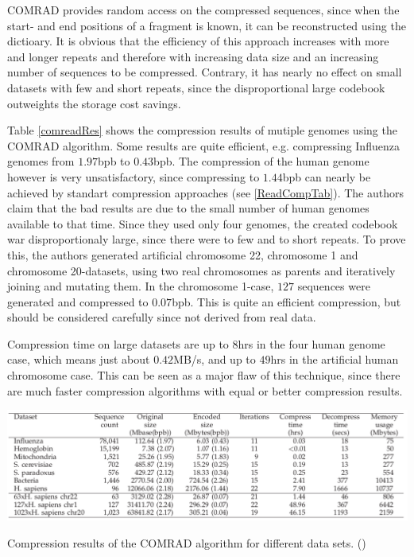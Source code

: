 \documentclass[acmtocl,acmnow]{article}
\begin{document}
COMRAD provides random access on the compressed sequences, since when the start- and end positions of a fragment is 
known, it can be reconstructed using the dictioary. It is obvious that the efficiency of this approach increases with more
and longer repeats and therefore with increasing data size and an increasing number of sequences to be compressed.
Contrary, it has nearly no effect on small datasets with few and short repeats, since the disproportional large codebook
outweights the storage cost savings.

Table \ref{comreadRes} shows the compression results of mutiple genomes using the COMRAD algorithm. Some results are quite
efficient, e.g. compressing Influenza genomes from $1.97$bpb to $0.43$bpb. The compression of the human genome however is
very unsatisfactory, since compressing to $1.44$bpb can nearly be achieved by standart compression approaches (see 
\ref{ReadCompTab}).
The authors claim that the bad results are due to the small number of human genomes available to that time. Since they
used only four genomes, the created codebook war disproportionaly large, since there were to few and to short repeats.
To prove this, the authors generated artificial chromosome 22, chromosome 1 and chromosome 20-datasets, using two
real chromosomes as parents and iteratively joining and mutating them. In the chromosome 1-case, $127$ sequences were
generated and compressed to $0.07$bpb. This is quite an efficient compression, but should be considered carefully since
not derived from real data.

Compression time on large datasets are up to $8$hrs in the four human genome case, which means just about $0.42$MB/s, and
up to $49$hrs in the artificial
human chromosome case. This can be seen as a major flaw of this technique, since there are much faster compression
algorithms with equal or better compression results.

\begin{table}
  \begin{center}
    \includegraphics[width=1.2\textwidth]{img/comradRes.png}
    \label{ComradRes}
    \caption{Compression results of the COMRAD algorithm for different data sets. (\cite{Kur})}
  \end{center}
\end{table}
\end{document}
